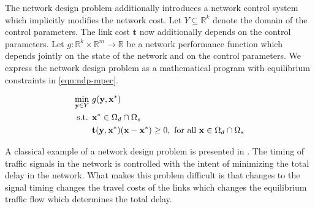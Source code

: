 The network design problem additionally introduces a network control system which implicitly modifies the network cost.
Let $Y\subseteq \mathbb{R}^k$ denote the domain of the control parameters. The link cost $\mathbf{t}$ now additionally depends on the control parameters.
Let $g:\mathbb{R}^k\times \mathbb{R}^m\to \mathbb{R}$ be a network performance function which depends jointly on the state of the network and on the control parameters.
We express the network design problem as a mathematical program with equilibrium constraints in \eqref{eqn:ndp-mpec}.

\begin{subequations}
\begin{align}
    \min_{\mathbf{y}\in Y}\ & g(\mathbf{y}, \mathbf{x^*})\\
    \text{ s.t. } 
        & \mathbf{x^*} \in \Omega_d \cap \Omega_s\\
        &  \mathbf{t}(\mathbf{y}, \mathbf{x^*})(\mathbf{x}- \mathbf{x^*}) \geq 0,\ \text{for all}\ \mathbf{x} \in \Omega_d\cap \Omega_s
\end{align}\label{eqn:ndp-mpec}
\end{subequations}

A classical example of a network design problem is presented in \citet{sheffi1983optimal}.
The timing of traffic signals in the network is controlled with the intent of minimizing the total delay in the network.
What makes this problem difficult is that changes to the signal timing changes the travel costs of the links which changes the equilibrium traffic flow which determines the total delay.



